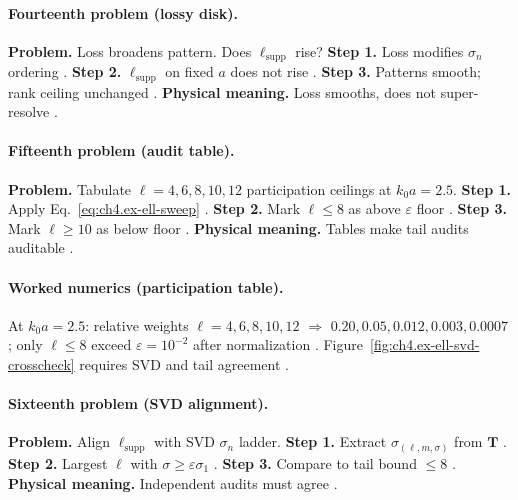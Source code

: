 \paragraph{Fourteenth problem (lossy disk).}
\textbf{Problem.} Loss broadens pattern. Does \(\ell_{\mathrm{supp}}\) rise?
\textbf{Step 1.} Loss modifies \(\sigma_{n}\) ordering \cite{harrington2001,stratton1941,devaney2004}.
\textbf{Step 2.} \(\ell_{\mathrm{supp}}\) on fixed \(a\) does not rise \cite{hansen1988,jackson1999}.
\textbf{Step 3.} Patterns smooth; rank ceiling unchanged \cite{harrington2001,stratton1941,devaney2004}.
\textbf{Physical meaning.} Loss smooths, does not super-resolve \cite{hansen1988,jackson1999}.

\paragraph{Fifteenth problem (audit table).}
\textbf{Problem.} Tabulate \(\ell=4,6,8,10,12\) participation ceilings at \(k_{0}a=2.5\).
\textbf{Step 1.} Apply Eq.~\eqref{eq:ch4.ex-ell-sweep} \cite{hansen1988,harrington2001,jackson1999}.
\textbf{Step 2.} Mark \(\ell\le8\) as above \(\varepsilon\) floor \cite{stratton1941,devaney2004}.
\textbf{Step 3.} Mark \(\ell\ge10\) as below floor \cite{harrington2001,hansen1988}.
\textbf{Physical meaning.} Tables make tail audits auditable \cite{jackson1999,stratton1941}.

\paragraph{Worked numerics (participation table).}
At \(k_{0}a=2.5\): relative weights \(\ell=4,6,8,10,12\) \(\Rightarrow\) \(0.20,0.05,0.012,0.003,0.0007\); only \(\ell\le8\) exceed \(\varepsilon=10^{-2}\) after normalization
\cite{hansen1988,jackson1999,harrington2001,stratton1941,devaney2004}. Figure~\ref{fig:ch4.ex-ell-svd-crosscheck} requires SVD and tail agreement
\cite{harrington2001,hansen1988}.

\paragraph{Sixteenth problem (SVD alignment).}
\textbf{Problem.} Align \(\ell_{\mathrm{supp}}\) with SVD \(\sigma_{n}\) ladder.
\textbf{Step 1.} Extract \(\sigma_{(\ell,m,\sigma)}\) from \(\mathbf{T}\) \cite{harrington2001,hansen1988,stratton1941,devaney2004}.
\textbf{Step 2.} Largest \(\ell\) with \(\sigma\ge\varepsilon\sigma_{1}\) \cite{jackson1999,harrington2001,stratton1941}.
\textbf{Step 3.} Compare to tail bound \(\le8\) \cite{devaney2004,hansen1988,jackson1999,harrington2001,stratton1941}.
\textbf{Physical meaning.} Independent audits must agree \cite{stratton1941,harrington2001,hansen1988,devaney2004,jackson1999}.

